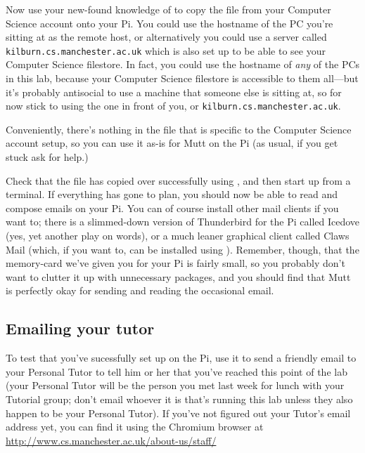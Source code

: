 Now use your new-found knowledge of  to copy the
 file from your Computer Science account onto your
Pi. You could use the hostname of the PC you're sitting at as the
remote host, or alternatively you could use a server called
\texttt{kilburn.cs.manchester.ac.uk} which is also set up to be able
to see your Computer Science filestore. In fact, you could use the
hostname of \textit{any} of the PCs in this lab, because your Computer
Science filestore is accessible to them all---but it's probably
antisocial to use a machine that someone else is sitting at, so for
now stick to using the one in front of you, or
\texttt{kilburn.cs.manchester.ac.uk}.

Conveniently, there's nothing in the  file that is
specific to the Computer Science account setup, so you can use it
as-is for Mutt on the Pi (as usual, if you get stuck ask for help.)

Check that the file has copied over successfully using
, and then start up  from a
terminal. If everything has gone to plan, you should now be able to
read and compose emails on your Pi. You can of course install other
mail clients if you want to; there is a slimmed-down version of
Thunderbird for the Pi called Icedove (yes, yet another play on
words), or a much leaner graphical client called Claws Mail (which, if
you want to, can be installed using ). Remember, though, that the memory-card we've given you
for your Pi is fairly small, so you probably don't want to clutter it
up with unnecessary packages, and you should find that Mutt is
perfectly okay for sending and reading the occasional email.

\subsection{Emailing your tutor}

To test that you've sucessfully set  up on the Pi,
use it to send a friendly email to your Personal Tutor to tell him or
her that you've reached this point of the lab (your Personal Tutor
will be the person you met last week for lunch with your Tutorial group;
don't email whoever it is that's running this lab unless they also
happen to be your Personal Tutor). If you've not figured out your
Tutor's email address yet, you can find it using the Chromium browser
at \\ \url{http://www.cs.manchester.ac.uk/about-us/staff/}

